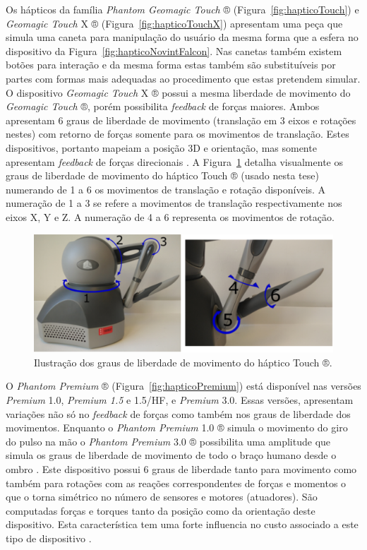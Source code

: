 Os hápticos da família \textit{Phantom Geomagic Touch} ® (Figura~\ref{fig:hapticoTouch}) e \textit{Geomagic Touch} X ® (Figura~\ref{fig:hapticoTouchX}) apresentam uma peça que simula uma caneta para manipulação do usuário da mesma forma que a esfera no dispositivo da Figura~\ref{fig:hapticoNovintFalcon}. Nas canetas também existem botões para interação e da mesma forma estas também são substituíveis por partes com formas mais adequadas ao procedimento que estas pretendem simular. O dispositivo \textit{Geomagic Touch} X ® possui a mesma liberdade de movimento do \textit{Geomagic Touch} ®, porém possibilita \textit{feedback} de forças maiores. Ambos apresentam 6 graus de liberdade de movimento (translação em 3 eixos e rotações nestes) com retorno de forças somente para os movimentos de translação. Estes dispositivos, portanto mapeiam a posição 3D e orientação, mas somente apresentam \textit{feedback} de forças direcionais \cite{Forsslund2013}. A Figura~\ref{fig:hapticoTouchDoFs} detalha visualmente os graus de liberdade de movimento do háptico Touch ® (usado nesta tese) numerando de 1 a 6 os movimentos de translação e rotação disponíveis. A numeração de 1 a 3 se refere a movimentos de translação respectivamente nos eixos X, Y e Z. A numeração de 4 a 6 representa os movimentos de rotação.

\begin{figure}[ht!]
    \centering
    \includegraphics[width=0.5\linewidth]{capitulos/figuras/Haptico-Touch-DoF.png}
    \caption{Ilustração dos graus de liberdade de movimento do háptico Touch ®.}
    \label{fig:hapticoTouchDoFs}
\end{figure}

O \textit{Phantom Premium} ® (Figura~\ref{fig:hapticoPremium}) está disponível nas versões \textit{Premium} 1.0, \textit{Premium 1.5} e 1.5/HF, e \textit{Premium} 3.0. Essas versões, apresentam variações não só no \textit{feedback} de forças como também nos graus de liberdade dos movimentos. Enquanto o \textit{Phantom Premium} 1.0 ® simula o movimento do giro do pulso na mão o \textit{Phantom Premium} 3.0 ® possibilita uma amplitude que simula os graus de liberdade de movimento de todo o braço humano desde o ombro \cite{3DSystems2018}. Este dispositivo possui 6 graus de liberdade tanto para movimento como também para rotações com as reações correspondentes de forças e momentos o que o torna simétrico no número de sensores e motores (atuadores). São computadas forças e torques tanto da posição como da orientação deste dispositivo. Esta característica tem uma forte influencia no custo associado a este tipo de dispositivo \cite{Forsslund2013}.

